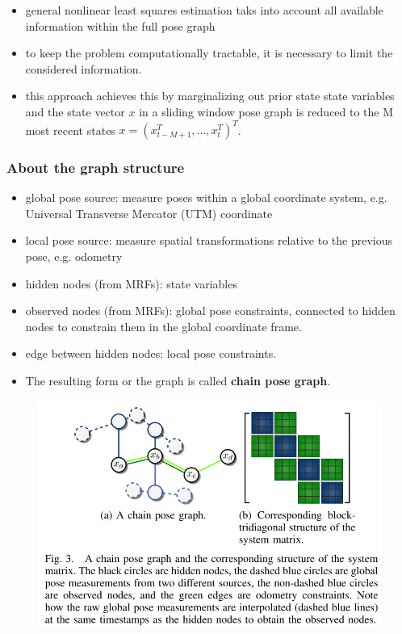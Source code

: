 \documentclass[letterpaper,10pt]{article}
\begin{document}
\begin{itemize}
	\item general nonlinear least squares estimation taks into account all available information within the full pose graph
	\item to keep the problem computationally tractable, it is necessary to limit the considered information.
	\item this approach achieves this by marginalizing out prior state state variables and the state vector $x$ in a sliding window pose graph is reduced to the M most recent states $x=(x_{t-M+1}^T,...,x_t^T)^T$.
\end{itemize}

\subsubsection{About the graph structure}

\begin{itemize}
	\item global pose source: measure poses within a global coordinate system, e.g. Universal Transverse Mercator (UTM) coordinate
	\item local pose source:  measure spatial transformations relative to the previous pose, e.g. odometry
	\item hidden nodes (from MRFs): state variables
	\item observed nodes (from MRFs): global pose constraints, connected to hidden nodes to constrain them in the global coordinate frame.
	\item edge between hidden nodes: local pose constraints.
	\item The resulting form or the graph is called \textbf{chain pose graph}.
\end{itemize}

\begin{figure}[!ht]
	\centering
	\includegraphics[width=15cm]{./img/posegraph.png}
\end{figure}
\end{document}
